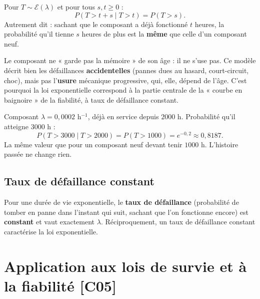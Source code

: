 \documentclass[a4paper,11pt]{article}
\begin{document}
\begin{theoreme}
Pour $T \sim \mathcal{E}(\lambda)$ et pour tous $s, t \geq 0$ :
\[
\boxed{P(T > t + s \mid T > t) = P(T > s)}.
\]
Autrement dit : sachant que le composant a déjà fonctionné $t$ heures, la probabilité qu'il tienne $s$ heures de plus est la \textbf{même} que celle d'un composant neuf.
\end{theoreme}

\begin{remarque}
Le composant ne « garde pas la mémoire » de son âge : il ne s'use pas. Ce modèle décrit bien les défaillances \textbf{accidentelles} (pannes dues au hasard, court-circuit, choc), mais pas l'\textbf{usure} mécanique progressive, qui, elle, dépend de l'âge. C'est pourquoi la loi exponentielle correspond à la partie centrale de la « courbe en baignoire » de la fiabilité, à taux de défaillance constant.
\end{remarque}

\begin{exemple}
Composant $\lambda = 0{,}0002$ h$^{-1}$, déjà en service depuis $2000$ h. Probabilité qu'il atteigne $3000$ h :
\[
P(T > 3000 \mid T > 2000) = P(T > 1000) = e^{-0{,}2} \approx 0{,}8187.
\]
La même valeur que pour un composant neuf devant tenir $1000$ h. L'histoire passée ne change rien.
\end{exemple}

\subsection{Taux de défaillance constant}

\begin{theoreme}
Pour une durée de vie exponentielle, le \textbf{taux de défaillance} (probabilité de tomber en panne dans l'instant qui suit, sachant que l'on fonctionne encore) est \textbf{constant} et vaut exactement $\lambda$. Réciproquement, un taux de défaillance constant caractérise la loi exponentielle.
\end{theoreme}

\newpage
\section{Application aux lois de survie et à la fiabilité \hfill {\normalsize\color{uimmred}[C05]}}
\end{document}
